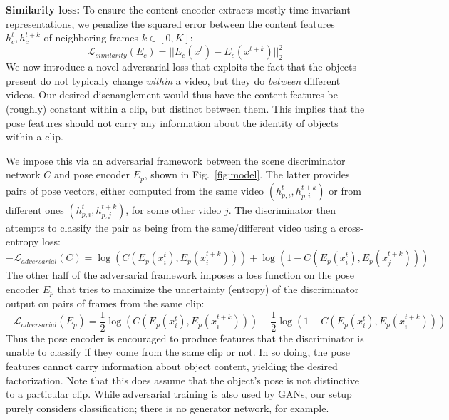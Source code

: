 \documentclass{article}
\newcommand{\fig}[1]{Fig.~\ref{fig:#1}}
\begin{document}
\textbf{Similarity loss:}%
To ensure the content encoder extracts mostly time-invariant representations, we penalize the squared error between the content features $h_c^t, h_c^{t+k}$ of neighboring frames $k \in [0,K]$:
\begin{equation}
    \mathcal{L}_{similarity}(E_c) =  ||E_c(x^t) - E_c(x^{t+k}) ||^2_2
\end{equation}%
We now introduce a novel adversarial loss that exploits the fact that the objects present do not typically change {\em within} a video, but they do {\em between} different videos. Our desired disenanglement would thus have the content features be (roughly) constant within a clip, but distinct between them. This implies that the pose features should not carry any information about the identity of objects within a clip.

We impose this via an adversarial framework between the scene discriminator network $C$ and pose encoder $E_p$, shown in \fig{model}. The latter provides pairs of pose vectors, either computed from the same video $(h_{p,i}^t, h_{p,i}^{t+k})$ or from different ones $(h_{p,i}^t, h_{p,j}^{t+k})$, for some other video $j$. The discriminator then attempts to classify the pair as being from the same/different video using a cross-entropy loss:
\begin{equation}
    - \mathcal{L}_{adversarial}(C) =  \log( C( E_p(x_i^t), E_p(x_i^{t+k})))  + \log( 1- C(E_p(x_i^t), E_p(x_j^{t+k})))
\end{equation}
The other half of the adversarial framework imposes a loss function on the pose encoder $E_p$ that tries to maximize the uncertainty (entropy) of the discriminator output on pairs of frames from the same clip:
\begin{equation}
    - \mathcal{L}_{adversarial}(E_p) = \frac{1}{2} \log( C( E_p(x_i^t), E_p(x_i^{t+k}))) + \frac{1}{2} \log( 1- C(E_p(x_i^t), E_p(x_i^{t+k})))
\end{equation}
Thus the pose encoder is encouraged to produce features that the discriminator is unable to classify if they come from the same clip or not. In so doing, the pose features cannot carry information about object content, yielding the desired factorization. Note that this does assume that the object's pose is not distinctive to a particular clip. While adversarial training is also used by GANs, our setup purely considers classification; there is no generator network, for example. 
\end{document}
